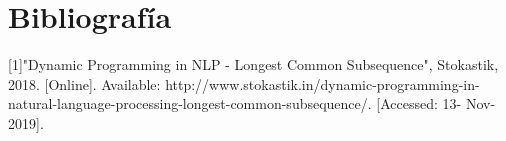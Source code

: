 \documentclass[12pt,twoside]{article}
\begin{document}
\section{Bibliograf\'ia}

[1]"Dynamic Programming in NLP - Longest Common Subsequence", Stokastik, 2018. [Online]. Available: http://www.stokastik.in/dynamic-programming-in-natural-language-processing-longest-common-subsequence/. [Accessed: 13- Nov- 2019].
\end{document}
